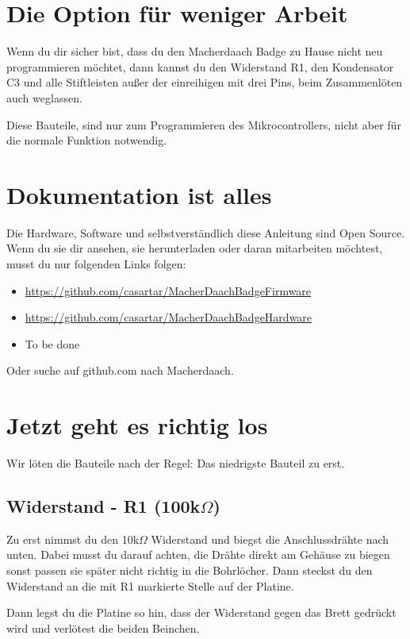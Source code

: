 \documentclass{article}
\begin{document}
\section{Die Option für weniger Arbeit}

Wenn du dir sicher bist, dass du den Macherdaach Badge zu Hause nicht neu programmieren möchtet, dann kannst du den Widerstand R1, den Kondensator C3 und alle Stiftleisten außer der einreihigen mit drei Pins, beim Zusammenlöten auch weglassen.

Diese Bauteile, sind nur zum Programmieren des Mikrocontrollers, nicht aber für die normale Funktion notwendig.

\section{Dokumentation ist alles}

Die Hardware, Software und selbstverständlich diese Anleitung sind Open Source. Wenn du sie dir ansehen, sie herunterladen oder daran mitarbeiten möchtest, musst du nur folgenden Links folgen:

\begin{itemize}
	\item \url{https://github.com/casartar/MacherDaachBadgeFirmware}
	\item \url{https://github.com/casartar/MacherDaachBadgeHardware}
	\item To be done
\end{itemize}

Oder suche auf github.com nach Macherdaach.

\section{Jetzt geht es richtig los}
Wir löten die Bauteile nach der Regel: Das niedrigste Bauteil zu erst.

\subsection{Widerstand - R1 (100k$\Omega$)}
Zu erst nimmst du den 10k$\Omega$ Widerstand und biegst die Anschlussdrähte nach unten. Dabei musst du darauf achten, die Drähte direkt am Gehäuse zu biegen sonst passen sie später nicht richtig in die Bohrlöcher. Dann steckst du den Widerstand an die mit R1 markierte Stelle auf der Platine.

Dann legst du die Platine so hin, dass der Widerstand gegen das Brett gedrückt wird und verlötest die beiden Beinchen.
\end{document}

